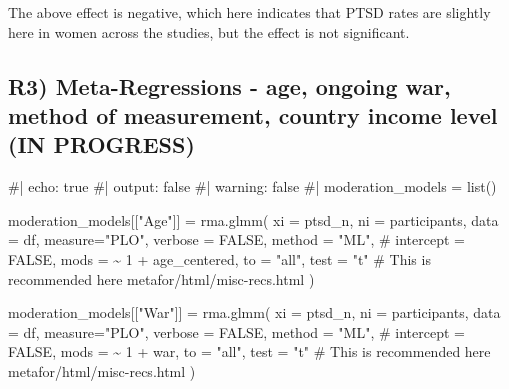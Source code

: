 \documentclass[
  letterpaper,
  DIV=11,
  numbers=noendperiod]{scrartcl}
\newenvironment{Shaded}{\begin{snugshade}}{\end{snugshade}}
\newcommand{\AttributeTok}[1]{\textcolor[rgb]{0.40,0.45,0.13}{#1}}
\newcommand{\CommentTok}[1]{\textcolor[rgb]{0.37,0.37,0.37}{#1}}
\newcommand{\ConstantTok}[1]{\textcolor[rgb]{0.56,0.35,0.01}{#1}}
\newcommand{\DecValTok}[1]{\textcolor[rgb]{0.68,0.00,0.00}{#1}}
\newcommand{\FunctionTok}[1]{\textcolor[rgb]{0.28,0.35,0.67}{#1}}
\newcommand{\NormalTok}[1]{\textcolor[rgb]{0.00,0.23,0.31}{#1}}
\newcommand{\OtherTok}[1]{\textcolor[rgb]{0.00,0.23,0.31}{#1}}
\newcommand{\SpecialCharTok}[1]{\textcolor[rgb]{0.37,0.37,0.37}{#1}}
\newcommand{\StringTok}[1]{\textcolor[rgb]{0.13,0.47,0.30}{#1}}
\begin{document}
The above effect is negative, which here indicates that PTSD rates are
slightly here in women across the studies, but the effect is not
significant.

\subsection{R3) Meta-Regressions - age, ongoing war, method of
measurement, country income level (IN
PROGRESS)}\label{r3-meta-regressions---age-ongoing-war-method-of-measurement-country-income-level-in-progress}

\begin{Shaded}
\begin{Highlighting}[]
\CommentTok{\#| echo: true}
\CommentTok{\#| output: false}
\CommentTok{\#| warning: false}
\CommentTok{\#|}
\NormalTok{moderation\_models }\OtherTok{=} \FunctionTok{list}\NormalTok{()}

\NormalTok{moderation\_models[[}\StringTok{"Age"}\NormalTok{]] }\OtherTok{=} \FunctionTok{rma.glmm}\NormalTok{(}
  \AttributeTok{xi =} \StringTok{\textasciigrave{}}\AttributeTok{ptsd\_n}\StringTok{\textasciigrave{}}\NormalTok{, }
  \AttributeTok{ni =} \StringTok{\textasciigrave{}}\AttributeTok{participants}\StringTok{\textasciigrave{}}\NormalTok{, }
  \AttributeTok{data =}\NormalTok{ df, }
  \AttributeTok{measure=}\StringTok{"PLO"}\NormalTok{,}
  \AttributeTok{verbose =} \ConstantTok{FALSE}\NormalTok{,}
  \AttributeTok{method =} \StringTok{"ML"}\NormalTok{,}
  \CommentTok{\# intercept = FALSE,}
  \AttributeTok{mods =} \SpecialCharTok{\textasciitilde{}} \DecValTok{1} \SpecialCharTok{+}\NormalTok{ age\_centered,}
  \AttributeTok{to =} \StringTok{"all"}\NormalTok{,}
  \AttributeTok{test =} \StringTok{"t"} \CommentTok{\# This is recommended here metafor/html/misc{-}recs.html}
\NormalTok{)}

\NormalTok{moderation\_models[[}\StringTok{"War"}\NormalTok{]] }\OtherTok{=} \FunctionTok{rma.glmm}\NormalTok{(}
  \AttributeTok{xi =} \StringTok{\textasciigrave{}}\AttributeTok{ptsd\_n}\StringTok{\textasciigrave{}}\NormalTok{, }
  \AttributeTok{ni =} \StringTok{\textasciigrave{}}\AttributeTok{participants}\StringTok{\textasciigrave{}}\NormalTok{, }
  \AttributeTok{data =}\NormalTok{ df, }
  \AttributeTok{measure=}\StringTok{"PLO"}\NormalTok{,}
  \AttributeTok{verbose =} \ConstantTok{FALSE}\NormalTok{,}
  \AttributeTok{method =} \StringTok{"ML"}\NormalTok{,}
  \CommentTok{\# intercept = FALSE,}
  \AttributeTok{mods =} \SpecialCharTok{\textasciitilde{}} \DecValTok{1} \SpecialCharTok{+}\NormalTok{ war,}
  \AttributeTok{to =} \StringTok{"all"}\NormalTok{,}
  \AttributeTok{test =} \StringTok{"t"} \CommentTok{\# This is recommended here metafor/html/misc{-}recs.html}
\NormalTok{)}


\end{Highlighting}
\end{Shaded}
\end{document}
